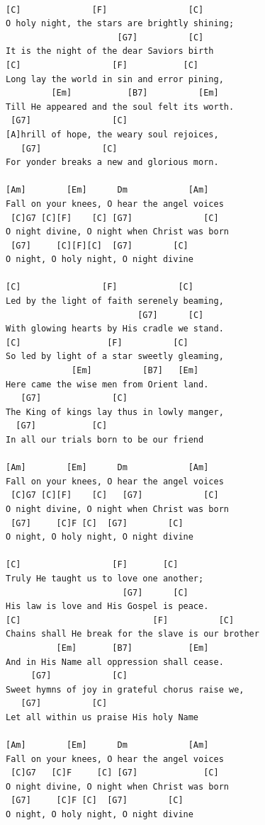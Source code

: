 \documentclass[]{book}
\begin{document}
\begin{verbatim}

[C]              [F]                [C]
O holy night, the stars are brightly shining;
                      [G7]          [C]
It is the night of the dear Saviors birth
[C]                  [F]           [C]
Long lay the world in sin and error pining,
         [Em]           [B7]          [Em]
Till He appeared and the soul felt its worth.
 [G7]                [C]           
[A]hrill of hope, the weary soul rejoices,
   [G7]            [C]               
For yonder breaks a new and glorious morn.

[Am]        [Em]      Dm            [Am]
Fall on your knees, O hear the angel voices
 [C]G7 [C][F]    [C] [G7]              [C]
O night divine, O night when Christ was born
 [G7]     [C][F][C]  [G7]        [C]
O night, O holy night, O night divine

[C]                [F]            [C]
Led by the light of faith serenely beaming,
                          [G7]      [C]
With glowing hearts by His cradle we stand.
[C]                 [F]          [C]
So led by light of a star sweetly gleaming,
             [Em]          [B7]   [Em]
Here came the wise men from Orient land.
   [G7]              [C]
The King of kings lay thus in lowly manger,
  [G7]           [C]
In all our trials born to be our friend

[Am]        [Em]      Dm            [Am]
Fall on your knees, O hear the angel voices
 [C]G7 [C][F]    [C]   [G7]            [C]
O night divine, O night when Christ was born
 [G7]     [C]F [C]  [G7]        [C]
O night, O holy night, O night divine

[C]                  [F]       [C]
Truly He taught us to love one another;
                       [G7]      [C]
His law is love and His Gospel is peace.
[C]                          [F]          [C]
Chains shall He break for the slave is our brother
          [Em]       [B7]           [Em]
And in His Name all oppression shall cease.
     [G7]            [C]
Sweet hymns of joy in grateful chorus raise we,
   [G7]          [C]
Let all within us praise His holy Name

[Am]        [Em]      Dm            [Am]
Fall on your knees, O hear the angel voices
 [C]G7   [C]F     [C] [G7]             [C]
O night divine, O night when Christ was born
 [G7]     [C]F [C]  [G7]        [C]
O night, O holy night, O night divine


\end{verbatim}
\end{document}
